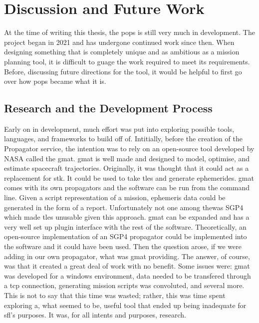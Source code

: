 \glsresetall{} 

\chapter{Discussion and Future Work}

\lettrine[lines=2, findent=0pt, nindent=5pt]{A}{}t the time of writing this
thesis, the \gls{pops} is still very much in development. The project began in
2021 and has undergone continued work since then. When designing something that
is completely unique and as ambitious as a mission planning tool, it is
difficult to guage the work required to meet its requirements. Before,
discussing future directions for the tool, it would be helpful to first go over
how \gls{pops} became what it is. 

\section{Research and the Development Process}

Early on in development, much effort was put into exploring possible tools,
languages, and frameworks to build off of. Intitially, before the creation of
the Propagator service, the intention was to rely on an open-source tool
developed by NASA called the \gls{gmat}. \gls{gmat} is well made and designed
to model, optimise, and estimate spacecraft trajectories. Originally, it was
thought that it could act as a replacement for \gls{stk}. It could be used to
take \glspl{tle} and generate ephemerides. \gls{gmat} comes with its own
propagators and the software can be run from the command line. Given a script
representation of a mission, ephemeris data could be generated in the form of a
report. Unfortunately not one among thewas SGP4 which made \glspl{tle} unusable
given this approach. \gls{gmat} can be expanded and has a very well set up
plugin interface with the rest of the software. Theoretically, an open-source
implementation of an SGP4 propagator could be implemented into the software and
it could have been used. Then the question arose, if we were adding in our own
propagator, what was \gls{gmat} providing. The answer, of course, was that it
created a great deal of work with no benefit. Some issues were: \gls{gmat} was
developed for a windows environment, data needed to be transfered through a
\gls{tcp} connection, generating mission scripts was convoluted, and several
more. This is not to say that this time was wasted; rather, this was time spent
exploring a, what seemed to be, useful tool that ended up being inadequate for
\gls{sfl}'s purposes. It was, for all intents and purposes, research.

